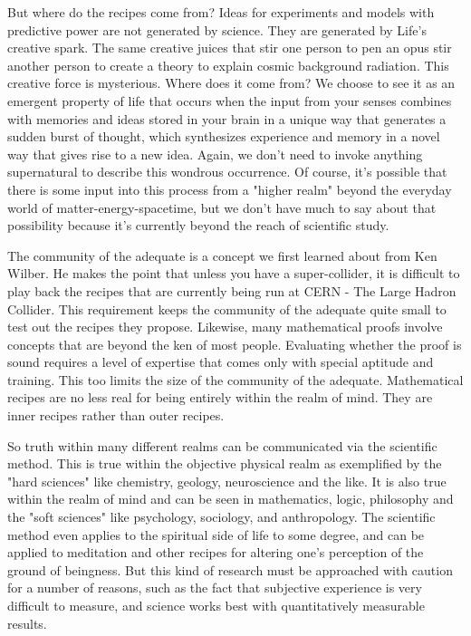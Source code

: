 \documentclass[ebook,12pt,openany,twoside]{memoir}
\begin{document}
But where do the recipes come from? Ideas for experiments and models with
predictive power are not generated by science. They are generated by Life's
creative spark. The same creative juices that stir one person to pen an opus
stir another person to create a theory to explain cosmic background radiation.
This creative force is mysterious. Where does it come from? We choose to see it
as an emergent property of life that occurs when the input from your senses
combines with memories and ideas stored in your brain in a unique way that
generates a sudden burst of thought, which synthesizes experience and memory in
a novel way that gives rise to a new idea. Again, we don't need to invoke
anything supernatural to describe this wondrous occurrence. Of course, it's
possible that there is some input into this process from a "higher realm"
beyond the everyday world of matter-energy-spacetime, but we don't have much to
say about that possibility because it's currently beyond the reach of
scientific study.

The community of the adequate is a concept we first learned about from Ken
Wilber. He makes the point that unless you have a super-collider, it is
difficult to play back the recipes that are currently being run at CERN - The
Large Hadron Collider. This requirement keeps the community of the adequate
quite small to test out the recipes they propose. Likewise, many mathematical
proofs involve concepts that are beyond the ken of most people. Evaluating
whether the proof is sound requires a level of expertise that comes only with
special aptitude and training. This too limits the size of the community of the
adequate. Mathematical recipes are no less real for being entirely within the
realm of mind. They are inner recipes rather than outer recipes.

So truth within many different realms can be communicated via the scientific
method. This is true within the objective physical realm as exemplified by the
"hard sciences" like chemistry, geology, neuroscience and the like. It is also
true within the realm of mind and can be seen in mathematics, logic, philosophy
and the "soft sciences" like psychology, sociology, and anthropology. The
scientific method even applies to the spiritual side of life to some degree,
and can be applied to meditation and other recipes for altering one's
perception of the ground of beingness. But this kind of research must be
approached with caution for a number of reasons, such as the fact that
subjective experience is very difficult to measure, and science works best with
quantitatively measurable results.
\end{document}
